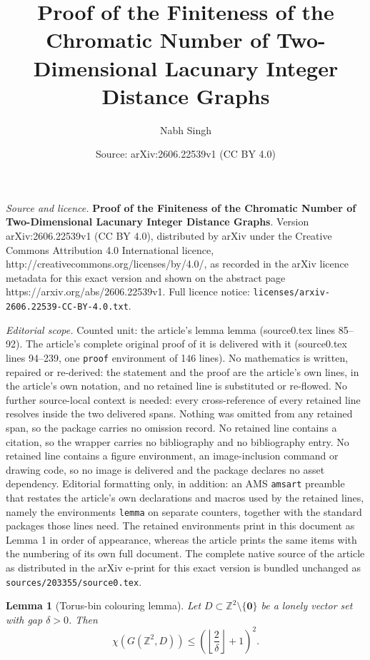 \documentclass[10pt,a4paper]{amsart}
\title{\textbf{Proof of the Finiteness of the Chromatic Number of Two-Dimensional Lacunary Integer Distance Graphs}}
\author{Nabh Singh}
\date{Source: arXiv:2606.22539v1 (CC BY 4.0)}
\newtheorem{lemma}{Lemma}
\newcommand{\Z}{\mathbb{Z}}
\newcommand{\floor}[1]{\left\lfloor#1\right\rfloor}
\begin{document}
\maketitle

\noindent\emph{Source and licence.} \textbf{Proof of the Finiteness of the Chromatic Number of Two-Dimensional Lacunary Integer Distance Graphs}. Version arXiv:2606.22539v1 (CC BY 4.0), distributed by arXiv under the Creative Commons Attribution 4.0 International licence, http://creativecommons.org/licenses/by/4.0/, as recorded in the arXiv licence metadata for this exact version and shown on the abstract page https://arxiv.org/abs/2606.22539v1. Full licence notice: \texttt{licenses/arxiv-2606.22539-CC-BY-4.0.txt}.\par\smallskip

\noindent\textit{Editorial scope.} Counted unit: the article's lemma lemma (source0.tex lines 85--92). The article's complete original proof of it is delivered with it (source0.tex lines 94--239, one \texttt{proof} environment of 146 lines). No mathematics is written, repaired or re-derived: the statement and the proof are the article's own lines, in the article's own notation, and no retained line is substituted or re-flowed.  No further source-local context is needed: every cross-reference of every retained line resolves inside the two delivered spans.  Nothing was omitted from any retained span, so the package carries no omission record.  No retained line contains a citation, so the wrapper carries no bibliography and no bibliography entry.  No retained line contains a figure environment, an image-inclusion command or drawing code, so no image is delivered and the package declares no asset dependency.  Editorial formatting only, in addition: an AMS \texttt{amsart} preamble that restates the article's own declarations and macros used by the retained lines, namely the environments \texttt{lemma} on separate counters, together with the standard packages those lines need.  The retained environments print in this document as Lemma 1 in order of appearance, whereas the article prints the same items with the numbering of its own full document.  The complete native source of the article as distributed in the arXiv e-print for this exact version is bundled unchanged as \texttt{sources/203355/source0.tex}.
\begin{lemma}[Torus-bin colouring lemma]
Let $D\subset \Z^2\setminus\{\mathbf 0\}$ be a lonely vector set with gap $\delta>0$. Then
\begin{equation}
    \chi(G(\Z^2,D))
    \le
    \left(\floor{\frac{2}{\delta}}+1\right)^2.
\end{equation}
\end{lemma}
\end{document}
